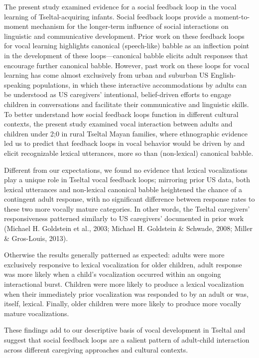\documentclass[
  man]{apa6}
\begin{document}
The present study examined evidence for a social feedback loop in the vocal learning of Tseltal-acquiring infants. Social feedback loops provide a moment-to-moment mechanism for the longer-term influence of social interactions on linguistic and communicative development. Prior work on these feedback loops for vocal learning highlights canonical (speech-like) babble as an inflection point in the development of these loops---canonical babble elicits adult responses that encourage further canonical babble. However, past work on these loops for vocal learning has come almost exclusively from urban and suburban US English-speaking populations, in which these interactive accommodations by adults can be understood as US caregivers' intentional, belief-driven efforts to engage children in conversations and facilitate their communicative and linguistic skills. To better understand how social feedback loops function in different cultural contexts, the present study examined vocal interaction between adults and children under 2;0 in rural Tseltal Mayan families, where ethnographic evidence led us to predict that feedback loops in vocal behavior would be driven by and elicit recognizable lexical utterances, more so than (non-lexical) canonical babble.

Different from our expectations, we found no evidence that lexical vocalizations play a unique role in Tseltal vocal feedback loops; mirroring prior US data, both lexical utterances and non-lexical canonical babble heightened the chance of a contingent adult response, with no significant difference between response rates to these two more vocally mature categories. In other words, the Tseltal caregivers' responsiveness patterned similarly to US caregivers' documented in prior work (Michael H. Goldstein et al., 2003; Michael H. Goldstein \& Schwade, 2008; Miller \& Gros-Louis, 2013).

Otherwise the results generally patterned as expected: adults were more exclusively responsive to lexical vocalization for older children, adult response was more likely when a child's vocalization occurred within an ongoing interactional burst. Children were more likely to produce a lexical vocalization when their immediately prior vocalization was responded to by an adult or was, itself, lexical. Finally, older children were more likely to produce more vocally mature vocalizations.

These findings add to our descriptive basis of vocal development in Tseltal and suggest that social feedback loops are a salient pattern of adult-child interaction across different caregiving approaches and cultural contexts.
\end{document}
